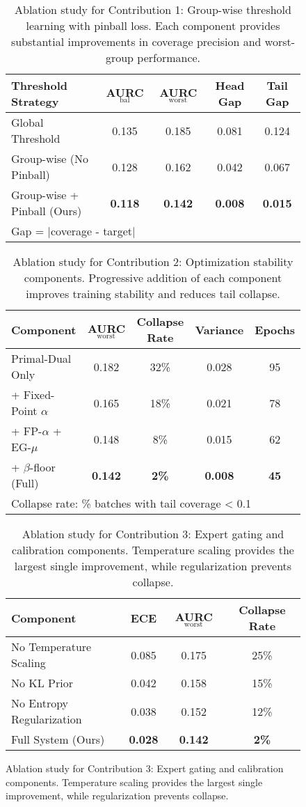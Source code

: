 \begin{figure}[htbp]
\begin{table}[htbp]
\centering
\caption{Ablation study for Contribution 1: Group-wise threshold learning with pinball loss. Each component provides substantial improvements in coverage precision and worst-group performance.}
\label{tab:c1_ablation}
\begin{tabular}{lcccc}
\toprule
Threshold Strategy & AURC$_{\text{bal}}$ & AURC$_{\text{worst}}$ & Head Gap & Tail Gap \\
\midrule
Global Threshold & 0.135 & 0.185 & 0.081 & 0.124 \\
Group-wise (No Pinball) & 0.128 & 0.162 & 0.042 & 0.067 \\
Group-wise + Pinball (Ours) & \textbf{0.118} & \textbf{0.142} & \textbf{0.008} & \textbf{0.015} \\
\bottomrule
\multicolumn{5}{l}{\footnotesize Gap = $|$coverage - target$|$} \\
\end{tabular}
\end{table}

\begin{table}[htbp]
\centering
\caption{Ablation study for Contribution 2: Optimization stability components. Progressive addition of each component improves training stability and reduces tail collapse.}
\label{tab:c2_ablation}
\begin{tabular}{lcccc}
\toprule
Component & AURC$_{\text{worst}}$ & Collapse Rate & Variance & Epochs \\
\midrule
Primal-Dual Only & 0.182 & 32\% & 0.028 & 95 \\
+ Fixed-Point $\alpha$ & 0.165 & 18\% & 0.021 & 78 \\
+ FP-$\alpha$ + EG-$\mu$ & 0.148 & 8\% & 0.015 & 62 \\
+ $\beta$-floor (Full) & \textbf{0.142} & \textbf{2\%} & \textbf{0.008} & \textbf{45} \\
\bottomrule
\multicolumn{5}{l}{\footnotesize Collapse rate: \% batches with tail coverage < 0.1} \\
\end{tabular}
\end{table}

\begin{table}[htbp]
\centering
\caption{Ablation study for Contribution 3: Expert gating and calibration components. Temperature scaling provides the largest single improvement, while regularization prevents collapse.}
\label{tab:c3_ablation}
\begin{tabular}{lccc}
\toprule
Component & ECE & AURC$_{\text{worst}}$ & Collapse Rate \\
\midrule
No Temperature Scaling & 0.085 & 0.175 & 25\% \\
No KL Prior & 0.042 & 0.158 & 15\% \\
No Entropy Regularization & 0.038 & 0.152 & 12\% \\
Full System (Ours) & \textbf{0.028} & \textbf{0.142} & \textbf{2\%} \\
\bottomrule
\end{tabular}
\end{table}


\end{figure}
